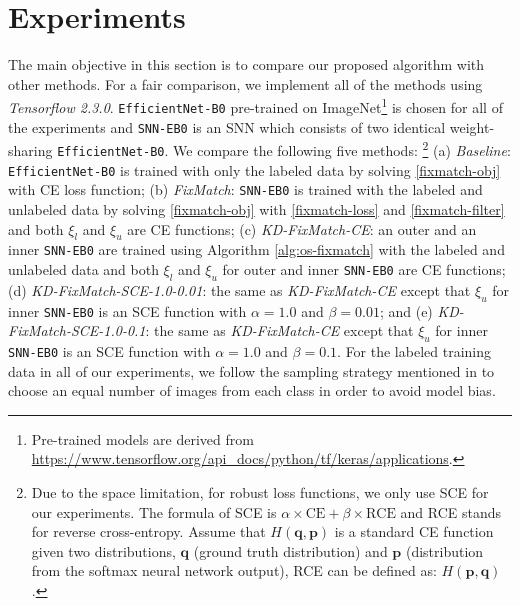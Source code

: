 \documentclass{article}
\def\bp{{\boldsymbol p}}
\def\bq{{\boldsymbol q}}
\def\EB0{{\tt EfficientNet-B0}}
\def\SNNEB0{{\tt SNN-EB0}}
\begin{document}
\section{Experiments}
\label{sec:exps}

The main objective in this section is to compare our proposed algorithm with other methods.
For a fair comparison, we implement all of the methods using {\sl Tensorflow 2.3.0}.
\EB0 \cite{MT19a} pre-trained on {\sf ImageNet}\footnote{
Pre-trained models are derived from \url{https://www.tensorflow.org/api_docs/python/tf/keras/applications}.
}
is chosen for all of the experiments and
\SNNEB0 is an SNN which consists of two identical weight-sharing \EB0.
We compare the following five methods:
\footnote{
    Due to the space limitation, for robust loss functions, we only use SCE for our experiments.
    The formula of SCE is $\alpha \times \text{CE} + \beta \times \text{RCE}$ and
    RCE stands for reverse cross-entropy.
    Assume that $H(\bq, \bp)$ is a standard CE function given two distributions, $\bq$ (ground truth distribution) and $\bp$ (distribution from the softmax neural network output),
    RCE can be defined as: $H(\bp, \bq)$.
}
(a) {\sl Baseline}: \EB0 is trained with only the labeled data by solving \eqref{fixmatch-obj} with CE loss function;
(b) {\sl FixMatch}: \SNNEB0 is trained with the labeled and unlabeled data by solving \eqref{fixmatch-obj} with \eqref{fixmatch-loss} and \eqref{fixmatch-filter} and both $\xi_l$ and $\xi_u$ are CE functions;
(c) {\sl KD-FixMatch-CE}: an outer and an inner \SNNEB0 are trained using Algorithm \ref{alg:os-fixmatch} with the labeled and unlabeled data 
        and both $\xi_l$ and $\xi_u$ for outer and inner \SNNEB0 are CE functions;
(d) {\sl KD-FixMatch-SCE-1.0-0.01}: the same as {\sl KD-FixMatch-CE} except that
        $\xi_u$ for inner \SNNEB0 is an SCE function with $\alpha = 1.0$ and $\beta = 0.01$; and
(e) {\sl KD-FixMatch-SCE-1.0-0.1}: the same as {\sl KD-FixMatch-CE} except that
        $\xi_u$ for inner \SNNEB0 is an SCE function with $\alpha = 1.0$ and $\beta = 0.1$.
For the labeled training data in all of our experiments, we follow the sampling strategy mentioned in \cite{KS20a} to choose an equal number of images from each class in order to avoid model bias.
\end{document}
